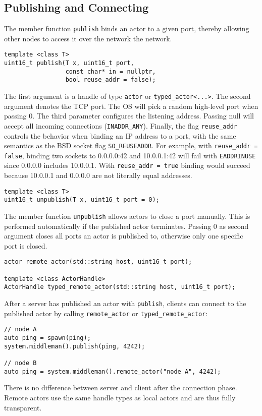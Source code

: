\subsection{Publishing and Connecting}
\label{remoting}

The member function \lstinline^publish^ binds an actor to a given port, thereby allowing other nodes to access it over the network the network.

\begin{lstlisting}
template <class T>
uint16_t publish(T x, uint16_t port,
                 const char* in = nullptr,
                 bool reuse_addr = false);
\end{lstlisting}

The first argument is a handle of type \lstinline^actor^ or \lstinline^typed_actor<...>^. The second argument denotes the TCP port. The OS will pick a random high-level port when passing 0. The third parameter configures the listening address. Passing null will accept all incoming connections (\lstinline^INADDR_ANY^). Finally, the flag \lstinline^reuse_addr^ controls the behavior when binding an IP address to a port, with the same semantics as the BSD socket flag \lstinline^SO_REUSEADDR^.
For example, with \lstinline^reuse_addr = false^, binding two sockets to 0.0.0.0:42 and 10.0.0.1:42 will fail with \texttt{EADDRINUSE} since 0.0.0.0 includes 10.0.0.1. 
With \lstinline^reuse_addr = true^ binding would succeed because 10.0.0.1 and
0.0.0.0 are not literally equal addresses.

\begin{lstlisting}
template <class T>
uint16_t unpublish(T x, uint16_t port = 0);
\end{lstlisting}

The member function \lstinline^unpublish^ allows actors to close a port manually. This is performed automatically if the published actor terminates. Passing 0 as second argument closes all ports an actor is published to, otherwise only one specific port is closed.

\begin{lstlisting}
actor remote_actor(std::string host, uint16_t port);

template <class ActorHandle>
ActorHandle typed_remote_actor(std::string host, uint16_t port);
\end{lstlisting}

After a server has published an actor with \lstinline^publish^, clients can connect to the published actor by calling \lstinline^remote_actor^ or \lstinline^typed_remote_actor^:

\begin{lstlisting}
// node A
auto ping = spawn(ping);
system.middleman().publish(ping, 4242);

// node B
auto ping = system.middleman().remote_actor("node A", 4242);
\end{lstlisting}

There is no difference between server and client after the connection phase. Remote actors use the same handle types as local actors and are thus fully transparent.
